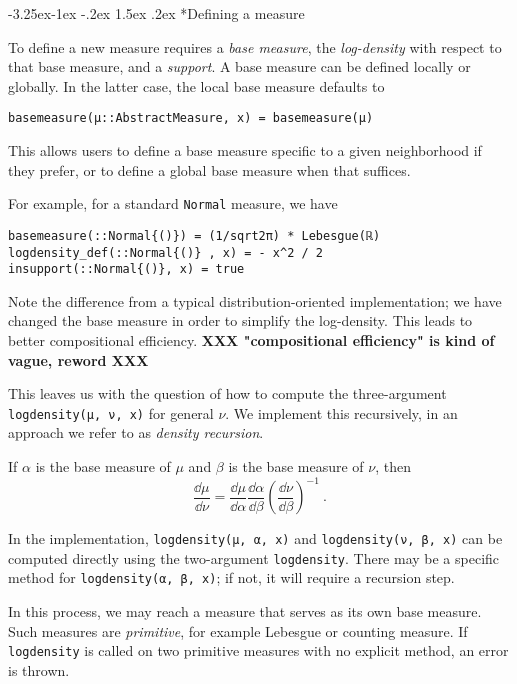 \documentclass{juliacon}
\makeatletter
\renewcommand\subsection{\@startsection{subsection}{2}{\z@}%
{-3.25ex\@plus -1ex \@minus -.2ex}%
{1.5ex \@plus .2ex}%
{\normalfont\bfseries}}
\makeatother
\begin{document}
\subsection*{Defining a measure}

To define a new measure requires a \emph{base measure}, the \emph{log-density} with respect to that base measure, and a \emph{support}. 
A base measure can be defined locally or globally. In the latter case, the local base measure defaults to 
\begin{verbatim}
basemeasure(μ::AbstractMeasure, x) = basemeasure(μ)
\end{verbatim}
This allows users to define a base measure specific to a given neighborhood if they prefer, or to define a global base measure when that suffices. 

For example, for a standard \verb|Normal| measure, we have

\begin{verbatim}
basemeasure(::Normal{()}) = (1/sqrt2π) * Lebesgue(ℝ)
logdensity_def(::Normal{()} , x) = - x^2 / 2 
insupport(::Normal{()}, x) = true
\end{verbatim}

Note the difference from a typical distribution-oriented implementation; we have changed the base measure in order to simplify the log-density. This leads to better compositional efficiency. {\bf XXX "compositional efficiency" is kind of vague, reword XXX}

This leaves us with the question of how to compute the three-argument \verb|logdensity(μ, ν, x)| for general $\nu$. We implement this recursively, in an approach we refer to as \emph{density recursion}.



If $\alpha$ is the base measure of $\mu$ and $\beta$ is the base measure of $\nu$, then
\[
\frac{\dd \mu}{\dd \nu} =
\frac{\dd \mu}{\dd \alpha}
\frac{\dd \alpha}{\dd \beta}
\left(\frac{\dd \nu}{\dd \beta}\right)^{-1}\ .
\]

In the implementation, \verb|logdensity(μ, α, x)| and \verb|logdensity(ν, β, x)| can be computed directly using the two-argument \verb|logdensity|. There may be a specific method for \verb|logdensity(α, β, x)|; if not, it will require a recursion step.

In this process, we may reach a measure that serves as its own base measure. Such measures are \emph{primitive}, for example Lebesgue or counting measure. If \verb|logdensity| is called on two primitive measures with no explicit method, an error is thrown.
\end{document}
